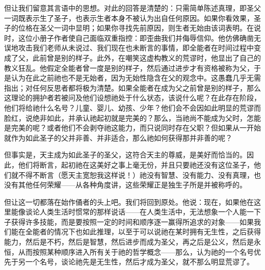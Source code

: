 但让我们留意其言语中的思想。对此的回答是清楚的：只需简单陈述真理，即圣父一词既表示生了圣子，也表示生者本身不被认为出自任何原因。如果你看效果，圣子的位格在圣父一词中显明；如果你寻找先前原因，则生者无始由该词表明。在说时，这位小册子作者使自己面临双重指控：即歪曲我们并侮辱信仰。他仿佛确凿无误地攻击我们老师从未说过、我们现在也未断言的事情，即全能者在时间过程中变成了父，此前曾是别的样子。此外，在嘲笑这虚构教义的荒谬时，他显出了自己的教义狂乱。他假定全能者曾一度是别的样子，然后通过进步才有资格被称为父，于是认为在此之前祂也不是无始者，因为无始性隐含在父的观念中。这愚蠢几乎无需指出；对任何反思者都将极为清楚。如果全能者在成为父之前曾是别的样子，那么这理论的拥护者若被问及他们设想祂处于什么状态，该说什么呢？在此存在阶段，他们将给祂什么名号？儿童、婴儿、幼孩、少年？他们会不会因如此明显的荒谬而脸红，说绝非如此，并承认祂起初就是完美的？那么，当祂尚不能成为父时，怎能是完美的呢？或者他们不会剥夺祂这能力，而只说同时存在父职？但如果从一开始就作为如此圣子的父并非善、并非适合，那么祂如何获得那并非善的呢？\par

但事实是，天主成为如此圣子的圣父，这符合天主的尊威，是美好而恰当的。因此，他们将断言，起初祂在这美好之事上毫无份，并且只要祂还没有这位圣子，他们就不得不断言（愿天主宽恕我这样说！）祂没有智慧、没有能力、没有真理，也没有其他任何荣耀——从各种角度讲，这些荣耀正是独生子所是并被称呼的。\par

但让这一切都落在始作俑者的头上吧。我们将回到原处。他说：现在，如果他在这里能像谈论人类生活时惯常的那样说话——在人类生活中，无法想象一个人能一下子获得许多技能，而是要按照一定的时间和顺序逐一赢得所追求的对象——如果我们能在全能者的情况下也如此推理，以至于可以说祂在某时拥有无生性，之后获得能力，然后是不朽，然后是智慧，然后进步而成为圣父，再之后是公义，然后是永恒，从而按照某种顺序进入所有关于祂的哲学概念——那么，认为祂的一个名号优先于另一个名号，谈论祂先是无生性，然后才成为圣父，就不那么明显荒谬了。\par

